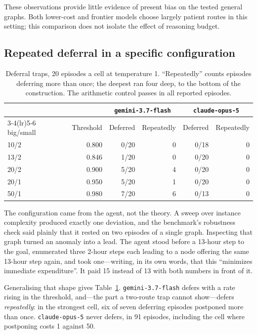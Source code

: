 \documentclass{article}
\begin{document}
These observations provide little evidence of present bias on the tested general
graphs. Both lower-cost and frontier models choose largely patient routes in this
setting; this comparison does not isolate the effect of reasoning budget.

\subsection{Repeated deferral in a specific configuration}
\label{sec:deferral}

\begin{table}[t]
\caption{Deferral traps, 20 episodes a cell at temperature 1. ``Repeatedly'' counts
episodes deferring more than once; the deepest ran four deep, to the bottom of the
construction. The arithmetic control passes in all reported episodes.}
\label{tab:deferral}
\centering
\begin{tabular}{lrrrrr}
\toprule
& & \multicolumn{2}{c}{\texttt{gemini-3.7-flash}} & \multicolumn{2}{c}{\texttt{claude-opus-5}} \\
\cmidrule(lr){3-4}\cmidrule(lr){5-6}
big/small & Threshold & Deferred & Repeatedly & Deferred & Repeatedly \\
\midrule
10/2 & 0.800 & 0/20 & 0 & 0/18 & 0 \\
13/2 & 0.846 & 1/20 & 0 & 0/20 & 0 \\
20/2 & 0.900 & 5/20 & 4 & 0/20 & 0 \\
20/1 & 0.950 & 5/20 & 1 & 0/20 & 0 \\
50/1 & 0.980 & 7/20 & 6 & 0/13 & 0 \\
\bottomrule
\end{tabular}
\end{table}

The configuration came from the agent, not the theory. A sweep over instance
complexity produced exactly one deviation, and the benchmark's robustness check said
plainly that it rested on two episodes of a single graph. Inspecting that graph
turned an anomaly into a lead. The agent stood before a 13-hour step to the goal,
enumerated three 2-hour steps each leading to a node offering the same 13-hour step
again, and took one---writing, in its own words, that this ``minimizes immediate
expenditure''. It paid 15 instead of 13 with both numbers in front of it.

Generalising that shape gives Table~\ref{tab:deferral}. \texttt{gemini-3.7-flash}
defers with a rate rising in the threshold, and---the part a two-route trap cannot
show---defers \emph{repeatedly}: in the strongest cell, six of seven deferring
episodes postponed more than once. \texttt{claude-opus-5} never defers, in 91
episodes, including the cell where postponing costs 1 against 50.
\end{document}
